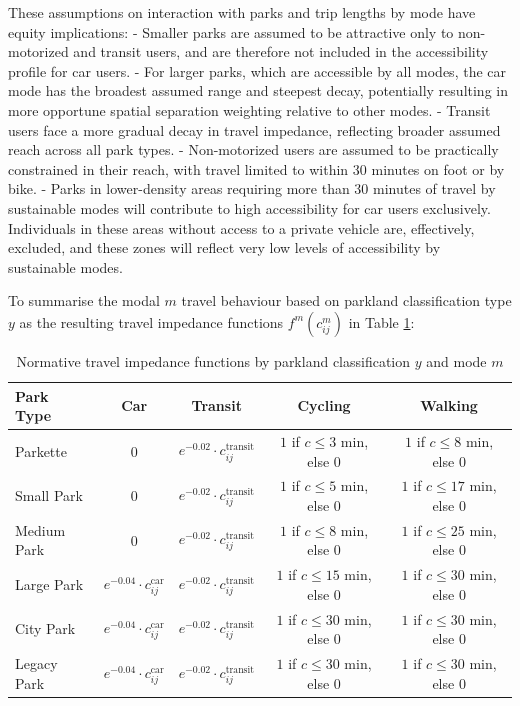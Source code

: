 \documentclass[
11pt, %
oneside, %
english, %
singlespacing, %
]{macthesis} %
\begin{document}
These assumptions on interaction with parks and trip lengths by mode have equity implications:
- Smaller parks are assumed to be attractive only to non-motorized and transit users, and are therefore not included in the accessibility profile for car users.
- For larger parks, which are accessible by all modes, the car mode has the broadest assumed range and steepest decay, potentially resulting in more opportune spatial separation weighting relative to other modes.
- Transit users face a more gradual decay in travel impedance, reflecting broader assumed reach across all park types.
- Non-motorized users are assumed to be practically constrained in their reach, with travel limited to within 30 minutes on foot or by bike.
- Parks in lower-density areas requiring more than 30 minutes of travel by sustainable modes will contribute to high accessibility for car users exclusively. Individuals in these areas without access to a private vehicle are, effectively, excluded, and these zones will reflect very low levels of accessibility by sustainable modes.

To summarise the modal \(m\) travel behaviour based on parkland classification type \(y\) as the resulting travel impedance functions \(f^m(c^m_{ij})\) in Table \ref{tab:chp2-travel-impedance-by-park-mode}:

\begin{table}[ht]
\centering
\small
\begin{tabular}{|l|c|c|c|c|}
\hline
\textbf{Park Type} & \textbf{Car} & \textbf{Transit} & \textbf{Cycling} & \textbf{Walking} \\
\hline
Parkette &
0 &
$e^{-0.02} \cdot c_{ij}^{\text{transit}}$ &
$1$ if $c \leq 3$ min, else 0 &
$1$ if $c \leq 8$ min, else 0 \\
\hline
Small Park &
0 &
$e^{-0.02} \cdot c_{ij}^{\text{transit}}$ &
$1$ if $c \leq 5$ min, else 0 &
$1$ if $c \leq 17$ min, else 0 \\
\hline
Medium Park &
0 &
$e^{-0.02} \cdot c_{ij}^{\text{transit}}$ &
$1$ if $c \leq 8$ min, else 0 &
$1$ if $c \leq 25$ min, else 0 \\
\hline
Large Park &
$e^{-0.04} \cdot c_{ij}^{\text{car}}$ &
$e^{-0.02} \cdot c_{ij}^{\text{transit}}$ &
$1$ if $c \leq 15$ min, else 0 &
$1$ if $c \leq 30$ min, else 0 \\
\hline
City Park &
$e^{-0.04} \cdot c_{ij}^{\text{car}}$ &
$e^{-0.02} \cdot c_{ij}^{\text{transit}}$ &
$1$ if $c \leq 30$ min, else 0 &
$1$ if $c \leq 30$ min, else 0 \\
\hline
Legacy Park &
$e^{-0.04} \cdot c_{ij}^{\text{car}}$ &
$e^{-0.02} \cdot c_{ij}^{\text{transit}}$ &
$1$ if $c \leq 30$ min, else 0 &
$1$ if $c \leq 30$ min, else 0 \\
\hline
\end{tabular}
\caption{Normative travel impedance functions by parkland classification $y$ and mode $m$}
\label{tab:chp2-travel-impedance-by-park-mode}
\end{table}
\end{document}
